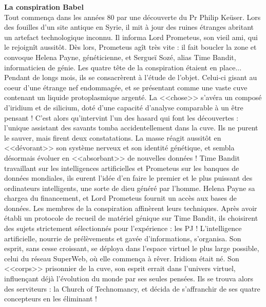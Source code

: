 \documentclass[11pt,twoside,a4paper]{book}
\begin{document}

\textbf{\Large La conspiration Babel}~\\

Tout commen\c{c}a dans les ann{\'e}es 80 par une d{\'e}couverte du Pr Philip Ke{\"u}ser. Lors des fouilles d'un site antique en Syrie, il mit {\`a} jour des ruines {\'e}tranges abritant un artefact technologique inconnu. Il informa Lord Prometeus, son vieil ami, qui le rejoign{\^i}t aussit{\^o}t. D{\`e}s lors, Prometeus ag{\^i}t tr{\`e}s vite : il fait boucler la zone et convoque Helena Payne, g{\'e}n{\'e}ticienne, et Sergue{\"i} Soz{\'e}, alias Time Bandit, informaticien de g{\'e}nie. Les quatre t{\^e}te de la conspiration {\'e}taient en place... Pendant de longs mois, ils se consacr{\`e}rent {\`a} l'{\'e}tude de l'objet. Celui-ci gisant au coeur d'une {\'e}trange nef endommag{\'e}e, et se pr{\'e}sentant comme une vaste cuve contenant un liquide protoplasmique argent{\'e}. La <<chose>> s'av{\'e}ra un compos{\'e} d'iridium et de silicium, dot{\'e} d'une capacit{\'e} d'analyse comparable {\`a} un {\^e}tre pensant ! C'est alors qu'intervint l'un des hasard qui font les d{\'e}couvertes : l'unique assistant des savants tomba accidentellement dans la cuve. Ils ne purent le sauver, mais firent deux constatations. La masse r{\'e}agit aussit{\^o}t en <<d{\'e}vorant>> son syst{\`e}me nerveux et son identit{\'e} g{\'e}n{\'e}tique, et sembla d{\'e}sormais {\'e}voluer en <<absorbant>> de nouvelles donn{\'e}es ! Time Bandit travaillant sur les intelligences artificielles et Prometeus sur les banques de donn{\'e}es mondiales, ils eurent l'id{\'e}e d'en faire le premier et le plus puissant des ordinateurs intelligents, une sorte de dieu g{\'e}n{\'e}r{\'e} par l'homme. Helena Payne sa chargea du financement, et Lord Prometeus fournit un acc{\`e}s aux bases de donn{\'e}es. Les membres de la conspiration affin{\`e}rent leurs techniques. Apr{\`e}s avoir {\'e}tabli un protocole de recueil de mat{\'e}riel g{\'e}nique sur Time Bandit, ils choisirent des sujets strictement s{\'e}lectionn{\'e}s pour l'exp{\'e}rience : les PJ ! L'intelligence artificielle, nourrie de pr{\'e}l{\`e}vements et gav{\'e}e d'informations, s'organisa. Son esprit, sans cesse croissant, se d{\'e}ploya dans l'espace virtuel le plus large possible, celui du r{\'e}seau SuperWeb, o{\`u} elle commen\c{c}a {\`a} r{\^e}ver. Iridiom {\'e}tait n{\'e}. Son <<corps>> prisonnier de la cuve, son esprit errait dans l'univers virtuel, influen\c{c}ant d{\'e}j{\`a} l'{\'e}volution du monde par ses seules pens{\'e}es. Ils se trouva alors des serviteurs : la Church of Technomancy, et d{\'e}cida de s'affranchir de ses quatre concepteurs en les {\'e}liminant ! ~\\
\end{document}
